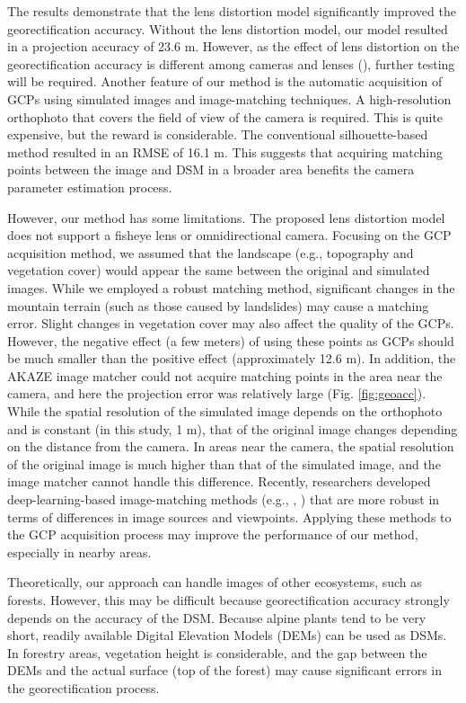 \documentclass{article}
\begin{document}
{The results demonstrate that the lens distortion model significantly improved the georectification accuracy. Without the lens distortion model, our model resulted in a projection accuracy of 23.6 m. However, as the effect of lens distortion on the georectification accuracy is different among cameras and lenses (\cite{Portenier2020Cryosphere}), further testing will be required. Another feature of our method is the automatic acquisition of GCPs using simulated images and image-matching techniques. A high-resolution orthophoto that covers the field of view of the camera is required. This is quite expensive, but the reward is considerable. The conventional silhouette-based method resulted in an RMSE of 16.1 m. This suggests that acquiring matching points between the image and DSM in a broader area benefits the camera parameter estimation process. 

However, our method has some limitations. The proposed lens distortion model does not support a fisheye lens or omnidirectional camera. Focusing on the GCP acquisition method, we assumed that the landscape (e.g., topography and vegetation cover) would appear the same between the original and simulated images. While we employed a robust matching method, significant changes in the mountain terrain (such as those caused by landslides) may cause a matching error. Slight changes in vegetation cover may also affect the quality of the GCPs. However, the negative effect (a few meters) of using these points as GCPs should be much smaller than the positive effect (approximately 12.6 m). In addition, the AKAZE image matcher could not acquire matching points in the area near the camera, and here the projection error was relatively large (Fig. \ref{fig:geoacc}). While the spatial resolution of the simulated image depends on the orthophoto and is constant (in this study, 1 m), that of the original image changes depending on the distance from the camera. In areas near the camera, the spatial resolution of the original image is much higher than that of the simulated image, and the image matcher cannot handle this difference. Recently, researchers developed deep-learning-based image-matching methods (e.g., \cite{Yang2018ImageMatching}, \cite{Wu2013AEImageMatching}) that are more robust in terms of differences in image sources and viewpoints. Applying these methods to the GCP acquisition process may improve the performance of our method, especially in nearby areas. 

Theoretically, our approach can handle images of other ecosystems, such as forests. However, this may be difficult because georectification accuracy strongly depends on the accuracy of the DSM. Because alpine plants tend to be very short, readily available Digital Elevation Models (DEMs) can be used as DSMs. In forestry areas, vegetation height is considerable, and the gap between the DEMs and the actual surface (top of the forest) may cause significant errors in the georectification process.

}
\end{document}
